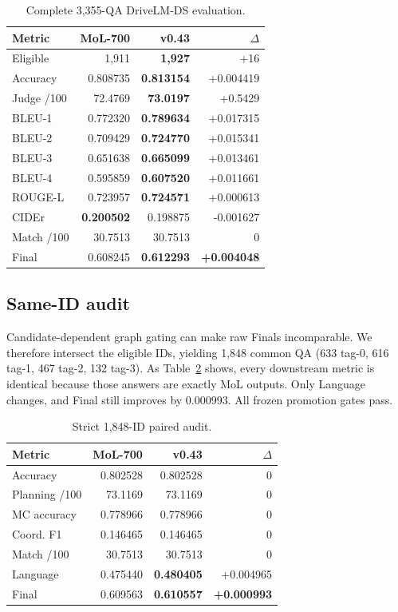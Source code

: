 \documentclass[10pt,twocolumn]{article}
\begin{document}
\begin{table}[t]
\centering
\small
\caption{Complete 3,355-QA DriveLM-DS evaluation.}
\label{tab:full}
\begin{tabular}{lrrr}
\toprule
Metric & MoL-700 & v0.43 & $\Delta$\\
\midrule
Eligible & 1,911 & \textbf{1,927} & +16\\
Accuracy & 0.808735 & \textbf{0.813154} & +0.004419\\
Judge /100 & 72.4769 & \textbf{73.0197} & +0.5429\\
BLEU-1 & 0.772320 & \textbf{0.789634} & +0.017315\\
BLEU-2 & 0.709429 & \textbf{0.724770} & +0.015341\\
BLEU-3 & 0.651638 & \textbf{0.665099} & +0.013461\\
BLEU-4 & 0.595859 & \textbf{0.607520} & +0.011661\\
ROUGE-L & 0.723957 & \textbf{0.724571} & +0.000613\\
CIDEr & \textbf{0.200502} & 0.198875 & -0.001627\\
Match /100 & 30.7513 & 30.7513 & 0\\
Final & 0.608245 & \textbf{0.612293} & \textbf{+0.004048}\\
\bottomrule
\end{tabular}
\end{table}

\subsection{Same-ID audit}
Candidate-dependent graph gating can make raw Finals incomparable. We therefore
intersect the eligible IDs, yielding 1,848 common QA (633 tag-0, 616 tag-1, 467
tag-2, 132 tag-3). As Table~\ref{tab:paired} shows, every downstream metric is
identical because those answers are exactly MoL outputs. Only Language changes,
and Final still improves by 0.000993. All frozen promotion gates pass.

\begin{table}[t]
\centering
\small
\caption{Strict 1,848-ID paired audit.}
\label{tab:paired}
\begin{tabular}{lrrr}
\toprule
Metric & MoL-700 & v0.43 & $\Delta$\\
\midrule
Accuracy & 0.802528 & 0.802528 & 0\\
Planning /100 & 73.1169 & 73.1169 & 0\\
MC accuracy & 0.778966 & 0.778966 & 0\\
Coord. F1 & 0.146465 & 0.146465 & 0\\
Match /100 & 30.7513 & 30.7513 & 0\\
Language & 0.475440 & \textbf{0.480405} & +0.004965\\
Final & 0.609563 & \textbf{0.610557} & \textbf{+0.000993}\\
\bottomrule
\end{tabular}
\end{table}
\end{document}
